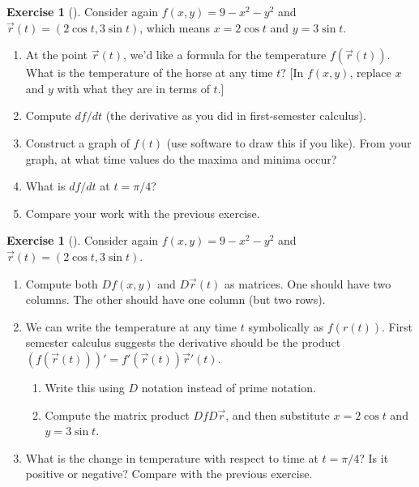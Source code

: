\documentclass[10pt,]{book}
\theoremstyle{plain}
\theoremstyle{definition}
\theoremstyle{definition}
\theoremstyle{definition}
\theoremstyle{definition}
\newtheorem{exploration}[project]{Exercise}
\theoremstyle{definition}
\numberwithin{equation}{section}
\begin{document}
\begin{exploration}[]\label{exploration-150}
Consider again \(f(x,y)=9-x^2-y^2\) and \(\vec r(t)=(2\cos t, 3\sin t)\), which means \(x=2\cos t\) and \(y=3\sin t\).%
\begin{enumerate}[font=\bfseries,label=(\alph*),ref=\alph*]
\item\label{task-347} At the point \(\vec r(t)\), we'd like a formula for the temperature \(f(\vec r(t))\). What is the temperature of the horse at any time \(t\)? [In \(f(x,y)\), replace \(x\) and \(y\) with what they are in terms of \(t\).]%
\item\label{task-348} Compute \(df/dt\) (the derivative as you did in first-semester calculus).%
\item\label{task-349} Construct a graph of \(f(t)\) (use software to draw this if you like). From your graph, at what time values do the maxima and minima occur?%
\item\label{task-350} What is \(df/dt\) at \(t=\pi/4\)?%
\item\label{task-351} Compare your work with the previous exercise.%
\end{enumerate}
\end{exploration}
\begin{exploration}[]\label{exploration-151}
Consider again \(f(x,y)=9-x^2-y^2\) and \(\vec r(t)=(2\cos t, 3\sin t)\).%
\begin{enumerate}[font=\bfseries,label=(\alph*),ref=\alph*]
\item\label{task-352} Compute both \(Df(x,y)\) and \(D\vec r(t)\) as matrices. One should have two columns.  The other should have one column (but two rows).%
\item\label{task-353} We can write the temperature at any time \(t\) symbolically as \(f(r(t))\). First semester calculus suggests the derivative should be the product \((f(\vec r(t))) ' = f'(\vec r(t))\vec r'(t)\).%
\begin{enumerate}[font=\bfseries,label=(\roman*),ref=\theenumi.\roman*]
\item\label{task-354} Write this using \(D\) notation instead of prime notation.%
\item\label{task-355} Compute the matrix product \(DfD\vec r\), and then substitute \(x=2\cos t\) and \(y=3\sin t\).%
\end{enumerate}
\item\label{task-356} What is the change in temperature with respect to time at \(t=\pi/4\)? Is it positive or negative? Compare with the previous exercise.%
\end{enumerate}
\end{exploration}
\typeout{************************************************}
\typeout{************************************************}
\end{document}
